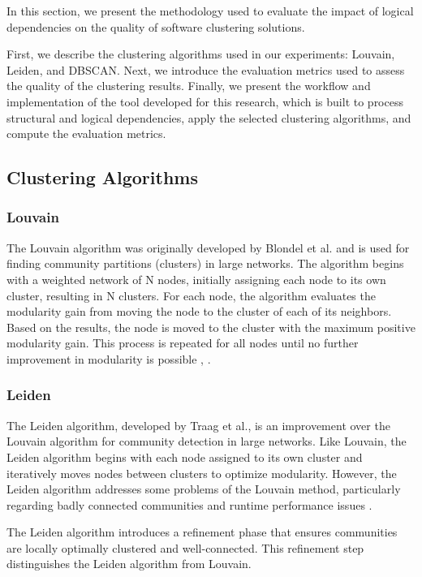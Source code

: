 \documentclass{ieeeaccess}
\begin{document}
In this section, we present the methodology used to evaluate the impact of logical dependencies on the quality of software clustering solutions.

First, we describe the clustering algorithms used in our experiments: Louvain, Leiden, and DBSCAN. Next, we introduce the evaluation metrics used to assess the quality of the clustering results. Finally, we present the workflow and implementation of the tool developed for this research, which is built to process structural and logical dependencies, apply the selected clustering algorithms, and compute the evaluation metrics.

\subsection{Clustering Algorithms}
\subsubsection{Louvain}
\label{subsubsec:louvain}

The Louvain algorithm was originally developed by Blondel et al. and is used for finding community partitions (clusters) in large networks. The algorithm begins with a weighted network of N nodes, initially assigning each node to its own cluster, resulting in N clusters. For each node, the algorithm evaluates the modularity gain from moving the node to the cluster of each of its neighbors. Based on the results, the node is moved to the cluster with the maximum positive modularity gain. This process is repeated for all nodes until no further improvement in modularity is possible \cite{b8}, \cite{b9}.

\subsubsection{Leiden}
\label{subsubsec:leiden}

The Leiden algorithm, developed by Traag et al., is an improvement over the Louvain algorithm for community detection in large networks. Like Louvain, the Leiden algorithm begins with each node assigned to its own cluster and iteratively moves nodes between clusters to optimize modularity. However, the Leiden algorithm addresses some problems of the Louvain method, particularly regarding badly connected communities and runtime performance issues \cite{leiden}.

The Leiden algorithm introduces a refinement phase that ensures communities are locally optimally clustered and well-connected. This refinement step distinguishes the Leiden algorithm from Louvain.
\end{document}
